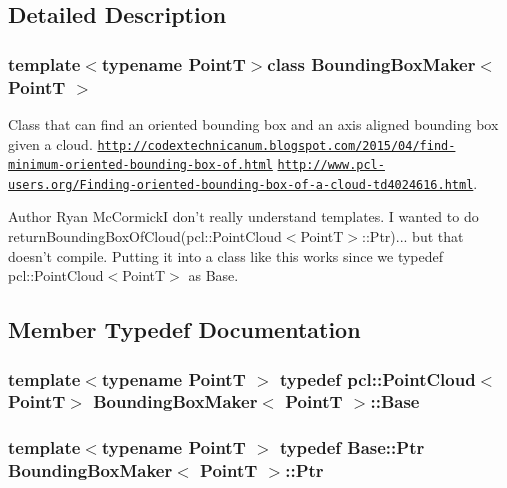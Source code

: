 \subsection{Detailed Description}
\subsubsection*{template$<$typename Point\-T$>$class Bounding\-Box\-Maker$<$ Point\-T $>$}

Class that can find an oriented bounding box and an axis aligned bounding box given a cloud. \href{http://codextechnicanum.blogspot.com/2015/04/find-minimum-oriented-bounding-box-of.html}{\tt http\-://codextechnicanum.\-blogspot.\-com/2015/04/find-\/minimum-\/oriented-\/bounding-\/box-\/of.\-html} \href{http://www.pcl-users.org/Finding-oriented-bounding-box-of-a-cloud-td4024616.html}{\tt http\-://www.\-pcl-\/users.\-org/\-Finding-\/oriented-\/bounding-\/box-\/of-\/a-\/cloud-\/td4024616.\-html}. 

\begin{DoxyAuthor}{Author}
Ryan Mc\-Cormick\-I don't really understand templates. I wanted to do return\-Bounding\-Box\-Of\-Cloud(pcl\-::\-Point\-Cloud$<$\-Point\-T$>$\-::\-Ptr)... but that doesn't compile. Putting it into a class like this works since we typedef pcl\-::\-Point\-Cloud$<$\-Point\-T$>$ as Base. 
\end{DoxyAuthor}


\subsection{Member Typedef Documentation}
\hypertarget{classBoundingBoxMaker_a1ab959296f462cd1be2211308f700e96}{
\subsubsection[{Base}]{\setlength{\rightskip}{0pt plus 5cm}template$<$typename Point\-T $>$ typedef pcl\-::\-Point\-Cloud$<${\bf Point\-T}$>$ {\bf Bounding\-Box\-Maker}$<$ {\bf Point\-T} $>$\-::{\bf Base}}}\label{classBoundingBoxMaker_a1ab959296f462cd1be2211308f700e96}
\hypertarget{classBoundingBoxMaker_a5e4d960f36f827a84eae516597a00959}{
\subsubsection[{Ptr}]{\setlength{\rightskip}{0pt plus 5cm}template$<$typename Point\-T $>$ typedef Base\-::\-Ptr {\bf Bounding\-Box\-Maker}$<$ {\bf Point\-T} $>$\-::{\bf Ptr}}}\label{classBoundingBoxMaker_a5e4d960f36f827a84eae516597a00959}


